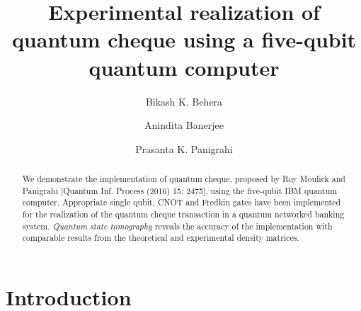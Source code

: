 \documentclass[aps,pra,twocolumn,groupedaddress,showpacs,showkeys]{revtex4-1}
\begin{document}
\title{Experimental realization of quantum cheque using a five-qubit quantum computer}%

\author{Bikash K. Behera}
%
\author{Anindita Banerjee}
%
\author{Prasanta K. Panigrahi}

\begin{abstract}
We demonstrate the implementation of quantum cheque, proposed by Roy Moulick and Panigrahi [Quantum Inf. Process (2016) 15: 2475], using the five-qubit IBM quantum computer. Appropriate single qubit, CNOT and Fredkin gates have been implemented for the realization of the quantum cheque transaction in a quantum networked banking system. \emph{Quantum state tomography} reveals the accuracy of the implementation with comparable results from the theoretical and experimental density matrices.     
\end{abstract}
\maketitle

\section{Introduction}
   
\end{document}
